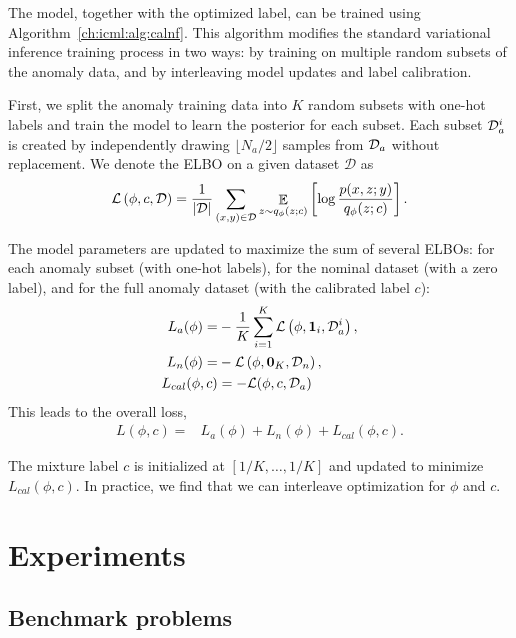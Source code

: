 The \ouralg{} model, together with the optimized label, can be trained using Algorithm~\ref{ch:icml:alg:calnf}. This algorithm modifies the standard variational inference training process in two ways: by training on multiple random subsets of the anomaly data, and by interleaving model updates and label calibration.

First, we split the anomaly training data into $K$ random subsets with one-hot labels and train the model to learn the posterior for each subset. Each subset $\mathcal{D}_a^i$ is created by independently drawing $\lfloor N_a/2 \rfloor$ samples from $\mathcal{D}_a$ without replacement. We denote the ELBO on a given dataset $\mathcal{D}$ as
\begin{equation}
    \mathcal{L}\left( \phi, c, \mathcal{D} \right) = \frac{1}{\left| \mathcal{D} \right|} \sum_{(x, y) \in \mathcal{D}} \mathop{\mathbb{E}}_{z\sim q_{\phi}(z; c)}\left[ \log \frac{p(x, z; y)}{q_\phi(z; c)} \right].
\end{equation}

The model parameters are updated to maximize the sum of several ELBOs: for each anomaly subset (with one-hot labels), for the nominal dataset (with a zero label), and for the full anomaly dataset (with the calibrated label $c$):
\begin{align}
    L_{a}(\phi) =    & -\frac{1}{K} \sum_{i=1}^K \mathcal{L}\left( \phi, \mathbf{1}_i, \mathcal{D}_a^i \right), \\
    L_{n}(\phi) =    & -\mathcal{L}\left( \phi, \mathbf{0}_K, \mathcal{D}_n \right),                            \\
    L_{cal}(\phi, c) & = -\mathcal{L}(\phi, c, \mathcal{D}_a)
\end{align}
This leads to the overall loss,
\begin{align}
    L(\phi, c) = & L_{a}(\phi) + L_{n}(\phi) + L_{cal}(\phi, c).
\end{align}

The mixture label $c$ is initialized at $[1/K, \ldots, 1/K]$ and updated to minimize $L_{cal}(\phi, c)$. In practice, we find that we can interleave optimization for $\phi$ and $c$.

\section{Experiments}\label{ch:icml:experiments}

\subsection{Benchmark problems}\label{ch:icml:examples}

